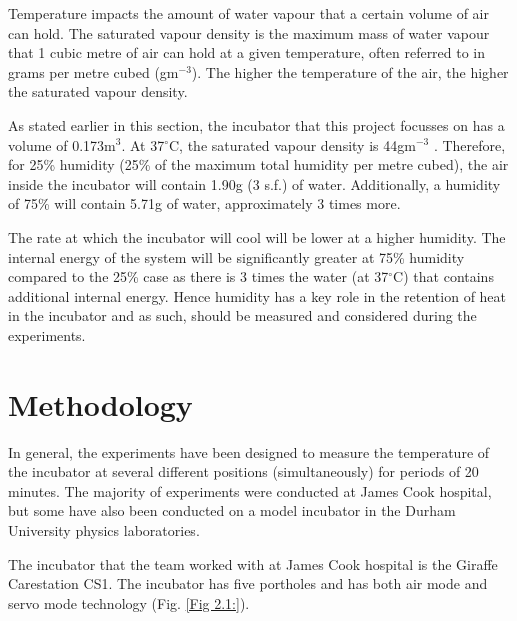 \documentclass{article}
\begin{document}
 \vspace{3mm}

Temperature impacts the amount of water vapour that a certain volume of air can hold. The saturated vapour density is the maximum mass of water vapour that 1 cubic metre of air can hold at a given temperature, often referred to in grams per metre cubed (gm$^{-3}$). The higher the temperature of the air, the higher the saturated vapour density.

 \vspace{3mm}

As stated earlier in this section, the incubator that this project focusses on has a volume of 0.173m$^{3}$. At 37$^{\circ}$C, the saturated vapour density is 44gm$^{-3}$ \cite{JG6}. Therefore, for 25\% humidity (25\% of the maximum total humidity per metre cubed), the air inside the incubator will contain 1.90g (3 s.f.) of water. Additionally, a humidity of 75\% will contain 5.71g of water, approximately 3 times more.  

 \vspace{3mm}

The rate at which the incubator will cool will be lower at a higher humidity. The internal energy of the system will be significantly greater at 75\% humidity compared to the 25\% case as there is 3 times the water (at 37$^{\circ}$C) that contains additional internal energy. Hence humidity has a key role in the retention of heat in the incubator and as such, should be measured and considered during the experiments. 

\section{Methodology} \label{MethodSection}

 In general, the experiments have been designed to measure the temperature of the incubator at several different positions (simultaneously) for periods of 20 minutes. The majority of experiments were conducted at James Cook hospital, but some have also been conducted on a model incubator in the Durham University physics laboratories.

\vspace{3mm}

 The incubator that the team worked with at James Cook hospital is the Giraffe Carestation CS1. The incubator has five portholes and has both air mode and servo mode technology (Fig. \ref{Fig 2.1:}).

\vspace{3mm}
\end{document}
